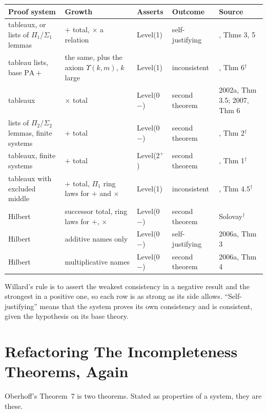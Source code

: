 \documentclass[11pt]{article}
\newcommand{\sk}{\ensuremath{^\dagger}}    %
\theoremstyle{plain}
\theoremstyle{definition}
\begin{document}
\begin{center}\footnotesize
\begin{tabular}{@{}>{\raggedright\arraybackslash}p{3.0cm}>{\raggedright\arraybackslash}p{3.3cm}>{\raggedright\arraybackslash}p{1.6cm}>{\raggedright\arraybackslash}p{2.2cm}>{\raggedright\arraybackslash}p{3.3cm}@{}}
\toprule
Proof system & Growth & Asserts & Outcome & Source \\
\midrule
tableaux, or lists of $\Pi_1$/$\Sigma_1$ lemmas & $+$ total, $\times$ a relation & Level(1) & self-justifying & 2005, Thms 3, 5 \\
tableau lists, base $\mathrm{PA}{+}$ & the same, plus the axiom $\Upsilon(k,m)$, $k$ large & Level(1) & inconsistent & 2005, Thm 6\sk \\
tableaux & $\times$ total & Level(0$-$) & second theorem & 2002a, Thm 3.5; 2007, Thm 6 \\
lists of $\Pi_2$/$\Sigma_2$ lemmas, finite systems & $+$ total & Level(0$-$) & second theorem & 2004, Thm 2\sk \\
tableaux, finite systems & $+$ total & Level($2^+$) & second theorem & 2004, Thm 1\sk \\
tableaux with excluded middle & $+$ total, $\Pi_1$ ring laws for $+$ and $\times$ & Level(1) & inconsistent & 2020, Thm 4.5\sk \\
Hilbert & successor total, ring laws for $+$, $\times$ & Level(0$-$) & second theorem & Solovay\sk \\
Hilbert & additive names only & Level(0$-$) & self-justifying & 2006a, Thm 3 \\
Hilbert & multiplicative names & Level(0$-$) & second theorem & 2006a, Thm 4 \\
\bottomrule
\end{tabular}
\end{center}

\noindent
Willard's rule is to assert the weakest consistency in a negative result and
the strongest in a positive one, so each row is as strong as its side allows.
``Self-justifying'' means that the system proves its own consistency and is
consistent, given the hypothesis on its base theory.

\section{Refactoring The Incompleteness Theorems, Again}

Oberhoff's Theorem~7 is two theorems. Stated as properties of a system,
they are these.
\end{document}
